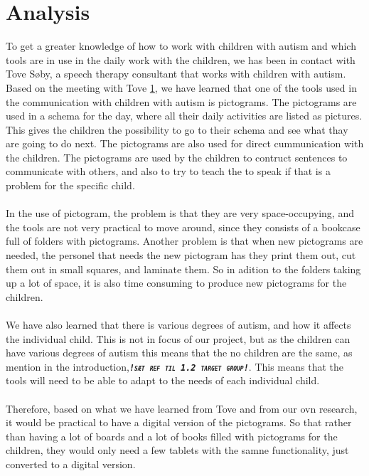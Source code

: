 \chapter{Analysis}

To get a greater knowledge of how to work with children with autism and which tools are in use in the daily work with the children, we has been in contact with  Tove S\o{}by, a speech therapy consultant that works with children with autism.\\ 

Based on the meeting with Tove \ref{}, we have learned that one of the tools used in the communication with children with autism is pictograms.
The pictograms are used in a schema for the day, where all their daily activities are listed as pictures. This gives the children the possibility to go to their schema and see what thay are going to do next. The pictograms are also used for direct cummunication with the children. The pictograms are used by the children to contruct sentences to communicate with others, and also to try to teach the to speak if that is a problem for the specific child.\\
\\
In the use of pictogram, the problem is that they are very space-occupying, and the tools are not very practical to move around, since they consists of a bookcase full of folders with pictograms. Another problem is that when new pictograms are needed, the personel that needs the new pictogram has they  print them out, cut them out in small squares, and laminate them. So in adition to the folders taking up a lot of space, it is also time consuming to produce new pictograms for the children.\\ 
\\
We have also learned that there is various degrees of autism, and how it affects the individual child. This is not in focus of our project, but as the children can have various degrees of autism this means that the no children are the same, as mention in the introduction,\emph{\textbf{\textit{\textsl{\texttt{\textsc{!s\ae{}t ref til 1.2 target group!}}}}}}. This means that the tools will need to be able to adapt to the needs of each individual child.\\
\\ 
Therefore, based on what we have learned from Tove and from our ovn research, it would be practical to have a digital version of the pictograms. So that rather than having a lot of boards and a lot of books filled with pictograms for the children, they would only need a few tablets with the samne functionality, just converted to a digital version.

